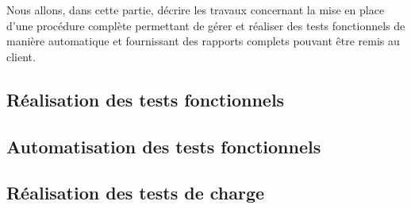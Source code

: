 	Nous allons, dans cette partie, décrire les travaux concernant la mise en place d'une procédure complète permettant de gérer et réaliser des tests fonctionnels de manière automatique et fournissant des rapports complets pouvant être remis au client.

\subsection{Réalisation des tests fonctionnels}
	

\subsection{Automatisation des tests fonctionnels}
	
	
\subsection{Réalisation des tests de charge}
	